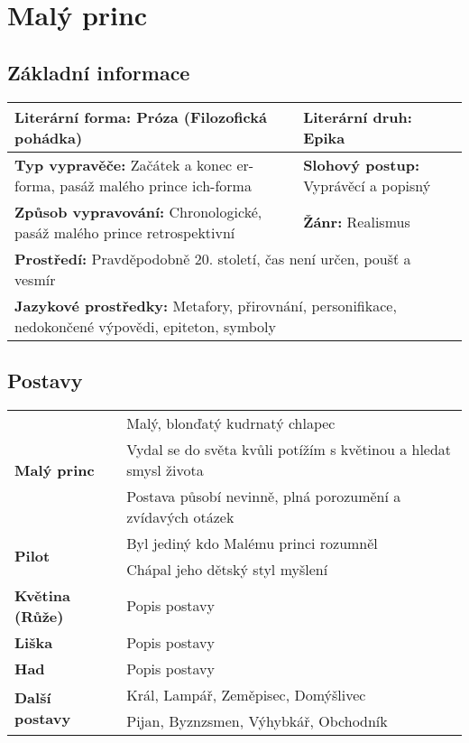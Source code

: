 \section{Malý princ}
\subsection*{Základní informace}
\begin{tabularx}{\linewidth}{l|l}
    \textbf{Literární forma:} Próza (Filozofická pohádka)                           & \textbf{Literární druh:} Epika               \\
    \hline
    \textbf{Typ vypravěče:} Začátek a konec er-forma, pasáž malého prince ich-forma & \textbf{Slohový postup:} Vyprávěcí a popisný \\
    \hline
    \textbf{Způsob vypravování:} Chronologické, pasáž malého prince retrospektivní  & \textbf{Žánr:} Realismus                     \\
    \hline
    \multicolumn{2}{l}{\textbf{Prostředí:} Pravděpodobně 20. století, čas není určen, poušť a vesmír}                              \\
    \hline
    \multicolumn{2}{l}{\textbf{Jazykové prostředky:} Metafory, přirovnání, personifikace, nedokončené výpovědi, epiteton, symboly} \\
\end{tabularx}
\subsection*{Postavy}
\begin{tabularx}{\linewidth}{l|l}
    \multirow{3}{15em}{\textbf{Malý princ}}    & Malý, blonďatý kudrnatý chlapec                                  \\
                                               & Vydal se do světa kvůli potížím s květinou a hledat smysl života \\
                                               & Postava působí nevinně, plná porozumění a zvídavých otázek       \\
    \hline
    \multirow{2}{15em}{\textbf{Pilot}}         & Byl jediný kdo Malému princi rozumněl                            \\
                                               & Chápal jeho dětský styl myšlení                                 \\
    \hline
    \textbf{Květina (Růže)}                    & Popis postavy                                                    \\
    \hline
    \textbf{Liška}                             & Popis postavy                                                    \\
    \hline
    \textbf{Had}                               & Popis postavy                                                    \\
    \hline
    \multirow{2}{15em}{\textbf{Další postavy}} & Král, Lampář, Zeměpisec, Domýšlivec                              \\
                                               & Pijan, Byznzsmen, Výhybkář, Obchodník                            \\
\end{tabularx}
